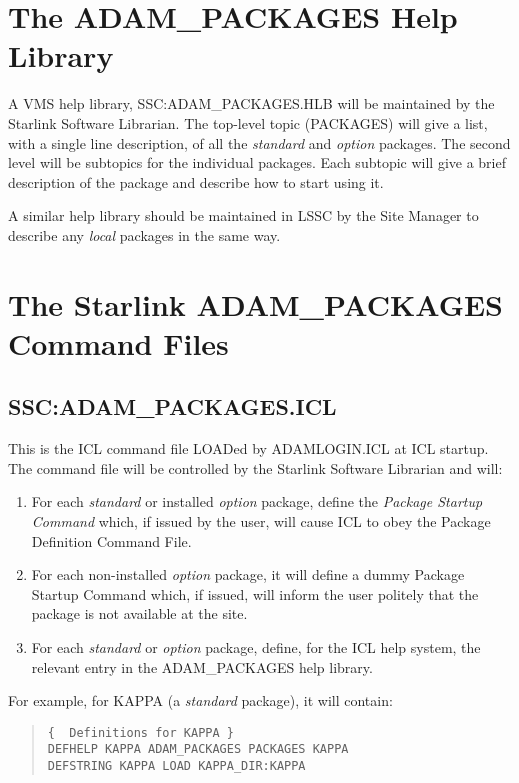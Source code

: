\section{The ADAM\_PACKAGES Help Library}
A VMS help library, SSC:\-ADAM\-\_PACKAGES\-.HLB will be maintained by the 
Starlink Software Librarian.
The top-level topic (PACKAGES) will give a list, with a single line
description, of all the {\em standard} and {\em option} packages.
The second level will be subtopics for the individual packages.
Each subtopic will give a brief description of the package and describe how
to start using it.

A similar help library should be maintained in LSSC by the Site Manager to
describe any {\em local} packages in the same way.

\section{The Starlink ADAM\_PACKAGES Command Files}
\label{packs}
\subsection{SSC:ADAM\_PACKAGES.ICL}
This is the ICL command file LOADed by ADAM\-LOGIN\-.ICL at ICL startup.
The command file will be controlled by the Starlink Software Librarian and
will:
\begin{enumerate}
\item For each {\em standard}\/ or installed {\em option}\/ package, define 
the {\em Package Startup Command} which, if issued by the user, will cause ICL
to obey the Package Definition Command File.
\item For each non-installed {\em option}\/ package, it will define a dummy 
Package Startup Command which, if issued, will inform the user politely that 
the package is not available at the site.
\item For each {\em standard} or {\em option} package, define, for the ICL
help system, the relevant entry in the ADAM\-\_PACKAGES help library.
\end{enumerate}

For example, for KAPPA (a {\em standard} package), it will contain:
\begin{quote}
\begin{verbatim}
{  Definitions for KAPPA }
DEFHELP KAPPA ADAM_PACKAGES PACKAGES KAPPA
DEFSTRING KAPPA LOAD KAPPA_DIR:KAPPA
\end{verbatim}
\end{quote}

